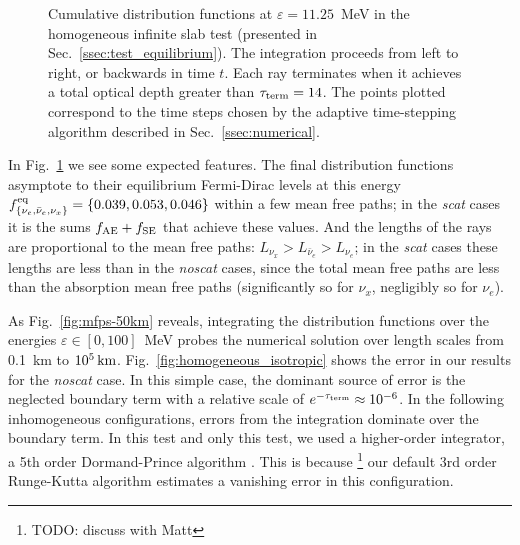 \documentclass[aps,floatfix,prd,superscriptaddress,twocolumn]{revtex4-1}
\begin{document}
\begin{figure}
  \resizebox{\columnwidth}{!}{}
  \caption{Cumulative distribution functions at $\varepsilon=11.25$~MeV
    in the homogeneous infinite slab test
    (presented in Sec.~\ref{ssec:test_equilibrium}).
    The integration proceeds from left to right, or backwards in time $t$.
    Each ray terminates when it achieves a total optical depth
    greater than $\tau_{\rm term}=14$.
    The points plotted correspond to the time steps chosen by the adaptive
    time-stepping algorithm described in Sec.~\ref{ssec:numerical}.
  }
  \label{fig:cumulative_f_homogeneous}
\end{figure}

In Fig.~\ref{fig:cumulative_f_homogeneous} we see some expected features.
The final distribution functions asymptote to their equilibrium Fermi-Dirac
levels at this energy
$f^{\rm eq}_{\{\nu_e,\bar{\nu}_e,\nu_x\}}=\{0.039, 0.053, 0.046\}$
within a few mean free paths;
in the \emph{scat} cases it is the sums $f_{\rm AE}+f_{\rm SE}$ that
achieve these values.
And the lengths of the rays are proportional to the mean free paths:
$L_{\nu_x}>L_{\bar{\nu}_e}>L_{\nu_e}$;
in the \emph{scat} cases these lengths are less than in the \emph{noscat} cases,
since the total mean free paths are less than the absorption mean free paths
(significantly so for $\nu_x$, negligibly so for $\nu_e$).

As Fig.~\ref{fig:mfps-50km} reveals, integrating the distribution functions
over the energies $\varepsilon\in[0,100]$~MeV
probes the numerical solution over length scales from
0.1~km to $10^{5}\,{\rm km}$.
Fig.~\ref{fig:homogeneous_isotropic} shows the error in our results for
the \emph{noscat} case.
In this simple case, the dominant source of error is the neglected
boundary term with a relative scale of $e^{-\tau_{\rm term}}\approx10^{-6}$.
In the following inhomogeneous configurations,
errors from the integration dominate over the boundary term.
In this test and only this test, we used a higher-order integrator, a 5th
order Dormand-Prince algorithm \cite{pres2007-nr_3rd_ed}. This is because
\footnote{TODO: discuss with Matt}
our default 3rd order Runge-Kutta algorithm estimates a vanishing error
in this configuration.
\end{document}
